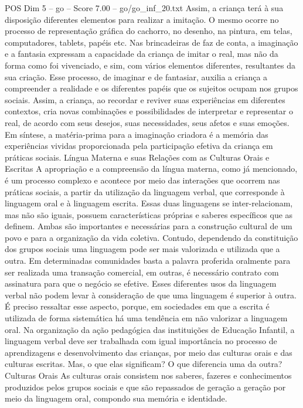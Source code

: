 \begin{textsample}{POS Dim 5 – go – Score 7.00 – go/go\_inf\_20.txt}
Assim, a criança terá à sua disposição diferentes elementos para realizar a imitação.
O mesmo ocorre no processo de representação gráfica do cachorro, no desenho, na pintura, em telas, computadores, tablets, papéis etc.
Nas brincadeiras de faz de conta, a imaginação e a fantasia expressam a capacidade da criança de imitar o real, mas não da forma como foi vivenciado, e sim, com vários elementos diferentes, resultantes da sua criação.
Esse processo, de imaginar e de fantasiar, auxilia a criança a compreender a realidade e os diferentes papéis que os sujeitos ocupam nos grupos sociais.
Assim, a criança, ao recordar e reviver suas experiências em diferentes contextos, cria novas combinações e possibilidades de interpretar e representar o real, de acordo com seus desejos, suas necessidades, seus afetos e suas emoções.
Em síntese, a matéria-prima para a imaginação criadora é a memória das experiências vividas proporcionada pela participação efetiva da criança em práticas sociais.
Língua Materna e suas Relações com as Culturas Orais e Escritas A apropriação e a compreensão da língua materna, como já mencionado, é um processo complexo e acontece por meio das interações que ocorrem nas práticas sociais, a partir da utilização da linguagem verbal, que corresponde à linguagem oral e à linguagem escrita.
Essas duas linguagens se inter-relacionam, mas não são iguais, possuem características próprias e saberes específicos que as definem.
Ambas são importantes e necessárias para a construção cultural de um povo e para a organização da vida coletiva.
Contudo, dependendo da constituição dos grupos sociais uma linguagem pode ser mais valorizada e utilizada que a outra.
Em determinadas comunidades basta a palavra proferida oralmente para ser realizada uma transação comercial, em outras, é necessário contrato com assinatura para que o negócio se efetive.
Esses diferentes usos da linguagem verbal não podem levar à consideração de que uma linguagem é superior à outra.
É preciso ressaltar esse aspecto, porque, em sociedades em que a escrita é utilizada de forma sistemática há uma tendência em não valorizar a linguagem oral.
Na organização da ação pedagógica das instituições de Educação Infantil, a linguagem verbal deve ser trabalhada com igual importância no processo de aprendizagens e desenvolvimento das crianças, por meio das culturas orais e das culturas escritas.
Mas, o que elas significam?
O que diferencia uma da outra?
Culturas Orais As culturas orais consistem nos saberes, fazeres e conhecimentos produzidos pelos grupos sociais e que são repassados de geração a geração por meio da linguagem oral, compondo sua memória e identidade.

\end{textsample}
